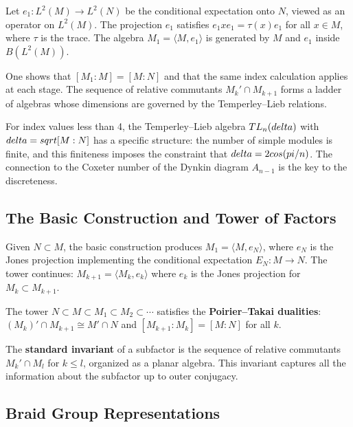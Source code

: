 Let $e_1: L^2(M) \to L^2(N)$ be the conditional expectation onto $N$, viewed as an operator on $L^2(M)$. The projection $e_1$ satisfies $e_1 x e_1 = \tau(x) e_1$ for all $x \in M$, where $\tau$ is the trace. The algebra $M_1 = \langle M, e_1 \rangle$ is generated by $M$ and $e_1$ inside $B(L^2(M))$.

One shows that $[M_1:M] = [M:N]$ and that the same index calculation applies at each stage. The sequence of relative commutants $M_k' \cap M_{k+1}$ forms a ladder of algebras whose dimensions are governed by the Temperley--Lieb relations.

For index values less than 4, the Temperley--Lieb algebra $TL_n(\\delta)$ with $\\delta = \\sqrt{[M:N]}$ has a specific structure: the number of simple modules is finite, and this finiteness imposes the constraint that $\\delta = 2\\cos(\\pi/n)$. The connection to the Coxeter number of the Dynkin diagram $A_{n-1}$ is the key to the discreteness.

\subsection*{The Basic Construction and Tower of Factors}

Given $N \subset M$, the basic construction produces $M_1 = \langle M, e_N \rangle$, where $e_N$ is the Jones projection implementing the conditional expectation $E_N: M \to N$. The tower continues: $M_{k+1} = \langle M_k, e_k \rangle$ where $e_k$ is the Jones projection for $M_k \subset M_{k+1}$.

The tower $N \subset M \subset M_1 \subset M_2 \subset \cdots$ satisfies the \textbf{Poirier--Takai dualities}: $(M_k)' \cap M_{k+1} \cong M' \cap N$ and $[M_{k+1}:M_k] = [M:N]$ for all $k$.

The \textbf{standard invariant} of a subfactor is the sequence of relative commutants $M_k' \cap M_l$ for $k \leq l$, organized as a planar algebra. This invariant captures all the information about the subfactor up to outer conjugacy.

\subsection*{Braid Group Representations}

